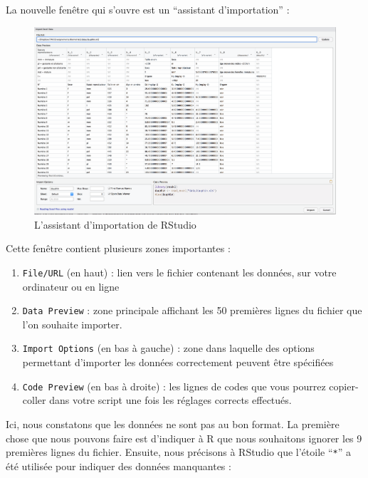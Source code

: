 \documentclass[a4paperpaper,]{article}
\providecommand{\tightlist}{%
  \setlength{\itemsep}{0pt}\setlength{\parskip}{0pt}}
\begin{document}
La nouvelle fenêtre qui s'ouvre est un ``assistant d'importation'' :

\begin{figure}[htpb]

{\centering \includegraphics[width=1\linewidth]{images/import2} 

}

\caption{L'assistant d'importation de RStudio}\label{fig:import2}
\end{figure}

Cette fenêtre contient plusieurs zones importantes :

\begin{enumerate}
\def\labelenumi{\arabic{enumi}.}
\tightlist
\item
  \texttt{File/URL} (en haut) : lien vers le fichier contenant les données, sur votre ordinateur ou en ligne
\item
  \texttt{Data\ Preview} : zone principale affichant les 50 premières lignes du fichier que l'on souhaite importer.
\item
  \texttt{Import\ Options} (en bas à gauche) : zone dans laquelle des options permettant d'importer les données correctement peuvent être spécifiées
\item
  \texttt{Code\ Preview} (en bas à droite) : les lignes de codes que vous pourrez copier-coller dans votre script une fois les réglages corrects effectués.
\end{enumerate}

Ici, nous constatons que les données ne sont pas au bon format. La première chose que nous pouvons faire est d'indiquer à R que nous souhaitons ignorer les 9 premières lignes du fichier. Ensuite, nous précisons à RStudio que l'étoile ``\texttt{*}'' a été utilisée pour indiquer des données manquantes :
\end{document}
